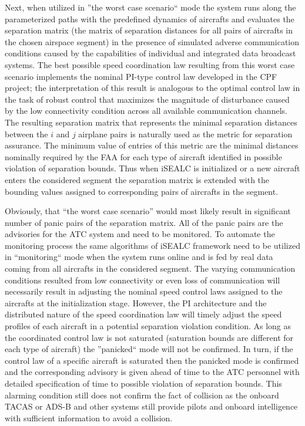 \documentclass[letter,onecolumn,12pt]{aiaa-tc}
\newcommand{\1}{1_n}
\begin{document}
Next, when utilized in ''the worst case scenario`` mode the system runs along the  parameterized paths with the predefined dynamics of aircrafts and evaluates the separation matrix (the matrix of separation distances for all pairs of aircrafts in the chosen airspace segment) in the presence of simulated adverse communication conditions caused by the capabilities of individual and integrated data broadcast systems. The best possible speed coordination law resulting from this worst case scenario implements the nominal PI-type control law developed in the CPF project; the interpretation of this result is analogous to the optimal control law in the task of robust control that maximizes the magnitude of disturbance caused by the low connectivity condition across all available communication channels.  The resulting separation matrix that represents the minimal separation distances between the $i$ and $j$ airplane pairs is naturally used as the metric for separation assurance. The minimum value of entries of this metric are the minimal distances nominally required by the FAA for each type of aircraft identified in possible violation of separation bounds. Thus when iSEALC is initialized or a new aircraft enters the considered segment the separation matrix is extended with the  bounding values assigned to corresponding pairs of aircrafts in the segment.

Obviously, that ``the worst case scenario'' would most likely result in significant number of panic pairs of the separation matrix. All of the panic pairs are the advisories for the ATC system and need to be monitored. To automate the monitoring process the same algorithms of iSEALC framework need to be utilized in ``monitoring`` mode when the system runs online and is fed by real data coming from all aircrafts in the considered segment. The varying communication conditions resulted from low connectivity or even loss of communication will necessarily result in adjusting the nominal speed control laws assigned to the aircrafts at the initialization stage. However, the PI architecture and the distributed nature of the speed coordination law will timely adjust the speed profiles of each aircraft in a potential separation violation condition. As long as the coordinated control law is not saturated (saturation bounds are different for each type of aircraft) the ''panicked`` mode will not be confirmed. In turn, if the control law of a specific aircraft is saturated then the panicked mode is confirmed and the corresponding advisory is given ahead of time to the ATC personnel with detailed specification of time to possible violation of separation bounds. This alarming condition still does not confirm the fact of collision as the onboard TACAS or ADS-B and other systems still provide pilots and onboard intelligence with sufficient information to avoid a collision.
\end{document}
